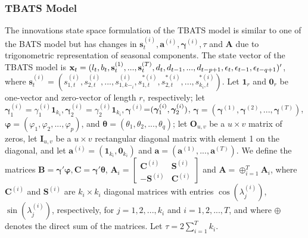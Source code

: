 \documentclass{uwstat572}
\begin{document}
\subsubsection{TBATS Model}
\hspace{4ex}The innovations state space formulation of the TBATS model is similar to one of the BATS model but has changes in $\textbf{s}_t^{(i)}, \textbf{a}^{(i)}, \bm{\gamma}^{(i)}, \tau$ and $\textbf{A}$ due to trigonometric representation of seasonal components. The state vector of the TBATS model is $\textbf{x}_t=(l_t,b_t,\textbf{s}_t^{(1)},...,\textbf{s}_t^{(T)}, d_t, d_{t-1},\\..., d_{t-p+1},  \epsilon_t, \epsilon_{t-1}, \epsilon_{t-q+1} )'$, 
where $\textbf{s}_t^{(i)}=(s_{1,t}^{(i)},s_{2,t}^{(i)},..., s_{1,k-_i}^{(i)}, s_{1,t}^{*(i)},s_{2,t}^{*(i)},...,s_{k_i,t}^{*(i)})$. 
Let $\textbf{1}_r$ and $\textbf{0}_r$ be one-vector and zero-vector of length $r$, respectively; let $\bm{\gamma}_1^{(i)}=\gamma_1^{(i)} \textbf{1}_{k_i}, \bm{\gamma}_2^{(i)}=\gamma_2^{(i)} \textbf{1}_{k_i}, \bm{\gamma}^{(i)}$=$(\bm{\gamma}_1^{(i)},\\ \bm{\gamma}_2^{(i)})$, $\bm{\gamma}=(\bm{\gamma}^{(1)},\bm{\gamma}^{(2)},...,\bm{\gamma}^{(T)})$, $\bm{\varphi}=(\varphi_1, \varphi_2,..., \varphi_p)$, and $\bm{\theta}=(\theta_1,\theta_2,...,\theta_q)$; let $\textbf{O}_{u,v}$ be a $u \times v$ matrix of zeros, let $\textbf{I}_{u,v}$ be a $u \times v$ rectangular diagonal matrix with element 1 on the diagonal, and let $\textbf{a}^{(i)}=(\textbf{1}_{k_i},\textbf{0}_{k_i})$ and $\textbf{a}=(\textbf{a}^{(1)},...,\textbf{a}^{(T)})$. We define the matrices $\textbf{B}=\bm{\gamma}'\bm{\varphi}, \textbf{C}=\bm{\gamma}'\bm{\theta}$, $\textbf{A}_i=\begin{bmatrix} 
\textbf{C}^{(i)} &\textbf{S}^{(i)}  \\ 
-\textbf{S}^{(i)}  &\textbf{C}^{(i)} 
\end{bmatrix}$ and $\textbf{A}=\oplus _{i=1}^T \textbf{A}_i$, where $\textbf{C}^{(i)}$ and $\textbf{S}^{(i)}$ are $k_i \times k_i$ diagonal matrices with entries $\cos (\lambda^{(i)}_j) $, $\sin (\lambda^{(i)}_j) $, respectively, for $j=1,2,...,k_i$ and $i=1,2,...,T$, and where $\oplus$ denotes the direct sum of the matrices. Let $\tau=2\sum_{i=1}^{T} k_i$. 
\end{document}
